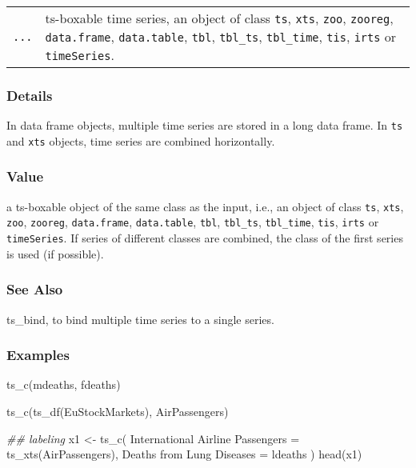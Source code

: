 \documentclass[
  letterpaper,
  DIV=11,
  numbers=noendperiod]{scrreport}
\newenvironment{Shaded}{\begin{snugshade}}{\end{snugshade}}
\newcommand{\AttributeTok}[1]{\textcolor[rgb]{0.40,0.45,0.13}{#1}}
\newcommand{\DocumentationTok}[1]{\textcolor[rgb]{0.37,0.37,0.37}{\textit{#1}}}
\newcommand{\FunctionTok}[1]{\textcolor[rgb]{0.28,0.35,0.67}{#1}}
\newcommand{\NormalTok}[1]{\textcolor[rgb]{0.00,0.23,0.31}{#1}}
\newcommand{\OtherTok}[1]{\textcolor[rgb]{0.00,0.23,0.31}{#1}}
\newcommand{\StringTok}[1]{\textcolor[rgb]{0.13,0.47,0.30}{#1}}
\begin{document}
\begin{longtable}[]{@{}ll@{}}
\toprule\noalign{}
\endhead
\bottomrule\noalign{}
\endlastfoot
\texttt{...} & ts-boxable time series, an object of class \texttt{ts},
\texttt{xts}, \texttt{zoo}, \texttt{zooreg}, \texttt{data.frame},
\texttt{data.table}, \texttt{tbl}, \texttt{tbl\_ts}, \texttt{tbl\_time},
\texttt{tis}, \texttt{irts} or \texttt{timeSeries}. \\
\end{longtable}

\subsubsection{Details}\label{details-17}

In data frame objects, multiple time series are stored in a long data
frame. In \texttt{ts} and \texttt{xts} objects, time series are combined
horizontally.

\subsubsection{Value}\label{value-55}

a ts-boxable object of the same class as the input, i.e., an object of
class \texttt{ts}, \texttt{xts}, \texttt{zoo}, \texttt{zooreg},
\texttt{data.frame}, \texttt{data.table}, \texttt{tbl},
\texttt{tbl\_ts}, \texttt{tbl\_time}, \texttt{tis}, \texttt{irts} or
\texttt{timeSeries}. If series of different classes are combined, the
class of the first series is used (if possible).

\subsubsection{See Also}\label{see-also-2}

ts\_bind, to bind multiple time series to a single series.

\subsubsection{Examples}\label{examples-55}

\begin{Shaded}
\begin{Highlighting}[]
\FunctionTok{ts\_c}\NormalTok{(mdeaths, fdeaths)}

\FunctionTok{ts\_c}\NormalTok{(}\FunctionTok{ts\_df}\NormalTok{(EuStockMarkets), AirPassengers)}

\DocumentationTok{\#\# labeling}
\NormalTok{x1 }\OtherTok{\textless{}{-}} \FunctionTok{ts\_c}\NormalTok{(}
  \StringTok{\textasciigrave{}}\AttributeTok{International Airline Passengers}\StringTok{\textasciigrave{}} \OtherTok{=} \FunctionTok{ts\_xts}\NormalTok{(AirPassengers),}
  \StringTok{\textasciigrave{}}\AttributeTok{Deaths from Lung Diseases}\StringTok{\textasciigrave{}} \OtherTok{=}\NormalTok{ ldeaths}
\NormalTok{)}
\FunctionTok{head}\NormalTok{(x1)}
\end{Highlighting}
\end{Shaded}
\end{document}
